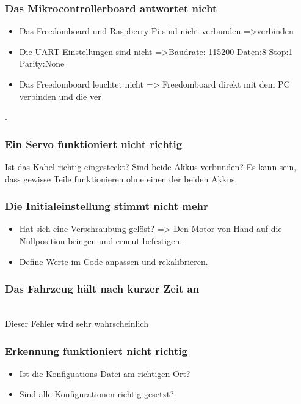 \subsubsection{Das Mikrocontrollerboard antwortet nicht}
\begin{itemize}
\item Das Freedomboard und Raspberry Pi sind nicht verbunden =>verbinden
\item Die UART Einstellungen sind nicht =>Baudrate: 115200 Daten:8 Stop:1 Parity:None
\item Das Freedomboard leuchtet nicht => Freedomboard direkt mit dem PC verbinden und die ver

\end{itemize}
. 
\subsubsection{Ein Servo funktioniert nicht richtig}
Ist das Kabel richtig eingesteckt?
Sind beide Akkus verbunden? Es kann sein, dass gewisse Teile funktionieren ohne einen der beiden Akkus.
\subsubsection{Die Initialeinstellung stimmt nicht mehr}
\begin{itemize}
\item Hat sich eine Verschraubung gelöst? => Den Motor von Hand auf die Nullposition bringen und erneut befestigen.
\item Define-Werte im Code anpassen und rekalibrieren.

\end{itemize}
\subsubsection{Das Fahrzeug hält nach kurzer Zeit an}\\[0.2cm]
Dieser Fehler wird sehr wahrscheinlich 

\subsubsection{Erkennung funktioniert nicht richtig}
\begin{itemize}
\item Ist die Konfiguations-Datei am richtigen Ort?
\item Sind alle Konfigurationen richtig gesetzt?
\end{itemize}

